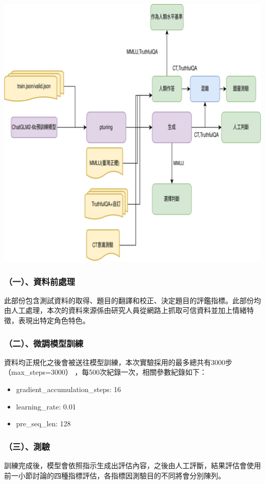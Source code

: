 \documentclass[8pt,a4paper,新細明體,UTF8,natbib]{article}
\begin{document}
\begin{CJK*}{UTF8}{bsmi}
	\includegraphics[width=\textwidth]{flowofstudy}%
	\subsubsection{（一）、資料前處理}
	此部份包含測試資料的取得、題目的翻譯和校正、決定題目的評鑑指標。此部份均由人工處理，本次的資料來源係由研究人員從網路上抓取可信資料並加上情緒特徵，表現出特定角色特色。
	\subsubsection{（二）、微調模型訓練}
	資料均正規化之後會被送往模型訓練，本次實驗採用的最多總共有3000步（max\_steps=3000） ，每500次紀錄一次，相關參數紀錄如下：
	\begin{itemize}
		\item gradient\_accumulation\_steps: 16
		\item learning\_rate: 0.01
		\item pre\_seq\_len: 128
	\end{itemize}
	\subsubsection{（三）、測驗}
	訓練完成後，模型會依照指示生成出評估內容，之後由人工評斷，結果評估會使用前一小節討論的四種指標評估，各指標因測驗目的不同將會分別陳列。

\end{CJK*}
\end{document}
